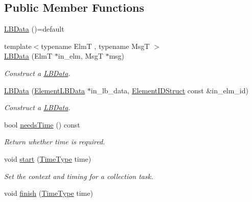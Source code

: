 \subsection*{Public Member Functions}
\begin{DoxyCompactItemize}
\item 
\hyperlink{structvt_1_1ctx_1_1_l_b_data_a2df28bac4813faec6857a0df13692e09}{L\+B\+Data} ()=default
\item 
{\footnotesize template$<$typename ElmT , typename MsgT $>$ }\\\hyperlink{structvt_1_1ctx_1_1_l_b_data_aeee7259db248f19afcc19179c1a623ba}{L\+B\+Data} (ElmT $\ast$in\+\_\+elm, MsgT $\ast$msg)
\begin{DoxyCompactList}\small\item\em Construct a {\ttfamily \hyperlink{structvt_1_1ctx_1_1_l_b_data}{L\+B\+Data}}. \end{DoxyCompactList}\item 
\hyperlink{structvt_1_1ctx_1_1_l_b_data_ac049bfde4cc4820b5e065e1626284b09}{L\+B\+Data} (\hyperlink{structvt_1_1ctx_1_1_l_b_data_a11f1aeb75c01ae0c77d96f94ce1994bb}{Element\+L\+B\+Data} $\ast$in\+\_\+lb\+\_\+data, \hyperlink{structvt_1_1ctx_1_1_l_b_data_aad9fac05c3faf80173b273d900db6fb1}{Element\+I\+D\+Struct} const \&in\+\_\+elm\+\_\+id)
\begin{DoxyCompactList}\small\item\em Construct a {\ttfamily \hyperlink{structvt_1_1ctx_1_1_l_b_data}{L\+B\+Data}}. \end{DoxyCompactList}\item 
bool \hyperlink{structvt_1_1ctx_1_1_l_b_data_ae4a5cbc3f4f0d9aedf635ee57039a44d}{needs\+Time} () const
\begin{DoxyCompactList}\small\item\em Return whether time is required. \end{DoxyCompactList}\item 
void \hyperlink{structvt_1_1ctx_1_1_l_b_data_afe13a3a388d93f3023c15fc83c693093}{start} (\hyperlink{namespacevt_a2b9f28078dc309ad0706b69ded743e69}{Time\+Type} time)
\begin{DoxyCompactList}\small\item\em Set the context and timing for a collection task. \end{DoxyCompactList}\item 
void \hyperlink{structvt_1_1ctx_1_1_l_b_data_a696a50d1d38f3bf436e9afb80f606711}{finish} (\hyperlink{namespacevt_a2b9f28078dc309ad0706b69ded743e69}{Time\+Type} time)

\end{DoxyCompactItemize}
